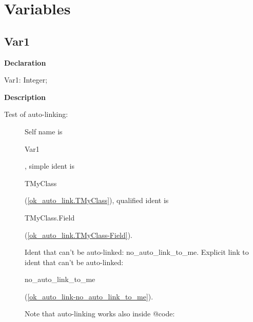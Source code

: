 \documentclass{report}
\newif\ifpdf
\begin{document}
\section{Variables}
\ifpdf
\subsection*{\large{\textbf{Var1}}\normalsize\hspace{1ex}\hrulefill}
\else
\subsection*{Var1}
\fi
\label{ok_auto_link-Var1}
\begin{list}{}{
\setlength{\itemindent}{0cm}
\setlength{\listparindent}{0cm}
\setlength{\leftmargin}{\evensidemargin}
\addtolength{\leftmargin}{\tmplength}
\settowidth{\labelsep}{X}
\addtolength{\leftmargin}{\labelsep}
\setlength{\labelwidth}{\tmplength}
}
\item[\textbf{Declaration}\hfill]
\ifpdf
\begin{flushleft}
\fi
\begin{ttfamily}
Var1: Integer;\end{ttfamily}

\ifpdf
\end{flushleft}
\fi

\par
\item[\textbf{Description}]
\begin{description}
\item[Test of auto{-}linking:]  Self name is \begin{ttfamily}Var1\end{ttfamily}, simple ident is \begin{ttfamily}TMyClass\end{ttfamily}(\ref{ok_auto_link.TMyClass}), qualified ident is \begin{ttfamily}TMyClass.Field\end{ttfamily}(\ref{ok_auto_link.TMyClass-Field}).

Ident that can't be auto{-}linked: no{\_}auto{\_}link{\_}to{\_}me. Explicit link to ident that can't be auto{-}linked: \begin{ttfamily}no{\_}auto{\_}link{\_}to{\_}me\end{ttfamily}(\ref{ok_auto_link-no_auto_link_to_me}).

Note that auto{-}linking works also inside @code:


\end{description}
\end{list}
\end{document}
